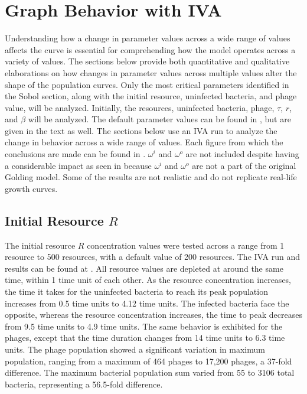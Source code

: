 \section{Graph Behavior with IVA}
\label{sec:results:graph_behavior}
Understanding how a change in parameter values across a wide range of values affects the curve is essential for comprehending how the model operates across a variety of values. 
The sections below provide both quantitative and qualitative elaborations on how changes in parameter values across multiple values alter the shape of the population curves. 
Only the most critical parameters identified in the Sobol section, along with the initial resource, uninfected bacteria, and phage value, will be analyzed. 
Initially, the resources, uninfected bacteria, phage, $\tau$, $r$, and $\beta$ will be analyzed. 
The default parameter values can be found in , but are given in the text as well. 
The sections below use an IVA run to analyze the change in behavior across a wide range of values. 
Each figure from which the conclusions are made can be found in . 
$\omega^i$ and $\omega^o$ are not included despite having a considerable impact as seen in  because $\omega^i$ and $\omega^o$ are not a part of the original Golding model. 
Some of the results are not realistic and do not replicate real-life growth curves. 

\subsection{Initial Resource $R$}
The initial resource $R$ concentration values were tested across a range from 1 resource to 500 resources, with a default value of 200 resources. 
The IVA run and results can be found at . 
All resource values are depleted at around the same time, within 1 time unit of each other. 
As the resource concentration increases, the time it takes for the uninfected bacteria to reach its peak population increases from 0.5 time units to 4.12 time units. 
The infected bacteria face the opposite, whereas the resource concentration increases, the time to peak decreases from 9.5 time units to 4.9 time units. 
The same behavior is exhibited for the phages, except that the time duration changes from 14 time units to 6.3 time units. 
The phage population showed a significant variation in maximum population, ranging from a maximum of 464 phages to 17,200 phages, a 37-fold difference. 
The maximum bacterial population sum varied from 55 to 3106 total bacteria, representing a 56.5-fold difference. 

